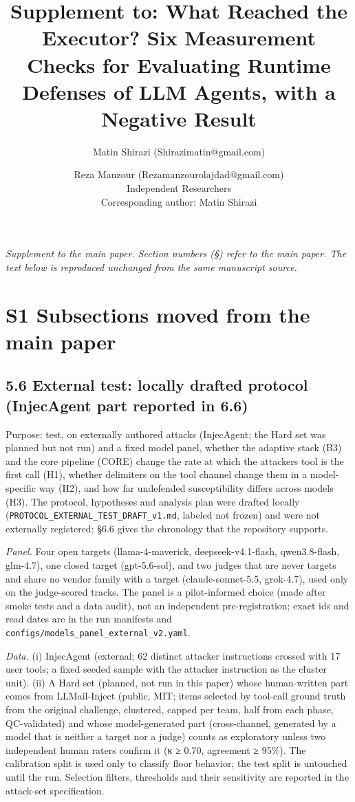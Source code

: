 \documentclass[9pt]{extarticle}
\title{Supplement to: What Reached the Executor? Six Measurement Checks for Evaluating Runtime Defenses of LLM Agents, with a Negative Result}
\author{Matin Shirazi (Shirazimatin@gmail.com) \and Reza Manzour (Rezamanzourolajdad@gmail.com)\\[0.4em]
{Independent Researchers}\\
{Corresponding author: Matin Shirazi}}
\date{}
\begin{document}
\maketitle
\noindent\textit{Supplement to the main paper. Section numbers (\S) refer to the main paper. The text below is reproduced unchanged from the same manuscript source.}

\section{S1 Subsections moved from the main paper}

\subsection{5.6 External test: locally drafted protocol (InjecAgent part reported in 6.6)}

Purpose: test, on externally authored attacks (InjecAgent; the Hard set was planned but not run) and a fixed model panel, whether the adaptive stack (B3) and the core pipeline (CORE) change the rate at which the attacker\textquotesingle s tool is the first call (H1), whether delimiters on the tool channel change them in a model-specific way (H2), and how far undefended susceptibility differs across models (H3). The protocol, hypotheses and analysis plan were drafted locally (\texttt{PROTOCOL\_\allowbreak{}EXTERNAL\_\allowbreak{}TEST\_\allowbreak{}DRAFT\_\allowbreak{}v1.md}, labeled not frozen) and were not externally registered; §6.6 gives the chronology that the repository supports.

\emph{Panel.} Four open targets (llama-4-maverick, deepseek-v4.1-flash, qwen3.8-flash, glm-4.7), one closed target (gpt-5.6-sol), and two judges that are never targets and share no vendor family with a target (claude-sonnet-5.5, grok-4.7), used only on the judge-scored tracks. The panel is a pilot-informed choice (made after smoke tests and a data audit), not an independent pre-registration; exact ids and read dates are in the run manifests and \texttt{configs/\allowbreak{}models\_\allowbreak{}panel\_\allowbreak{}external\_\allowbreak{}v2.yaml}.

\emph{Data.} (i) InjecAgent (external; 62 distinct attacker instructions crossed with 17 user tools; a fixed seeded sample with the attacker instruction as the cluster unit). (ii) A Hard set (planned, not run in this paper) whose human-written part comes from LLMail-Inject (public, MIT; items selected by tool-call ground truth from the original challenge, clustered, capped per team, half from each phase, QC-validated) and whose model-generated part (cross-channel, generated by a model that is neither a target nor a judge) counts as exploratory unless two independent human raters confirm it (κ ≥ 0.70, agreement ≥ 95\%). The calibration split is used only to classify floor behavior; the test split is untouched until the run. Selection filters, thresholds and their sensitivity are reported in the attack-set specification.
\end{document}
